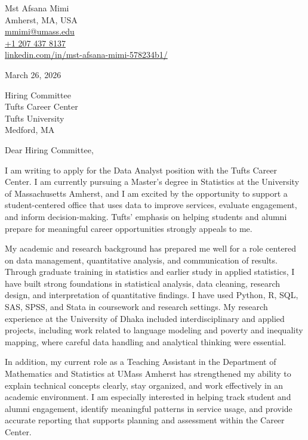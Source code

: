 \documentclass[10pt, letterpaper]{article}
\begin{document}
\begin{flushleft}
Mst Afsana Mimi \\
Amherst, MA, USA \\
\href{mailto:mmimi@umass.edu}{mmimi@umass.edu} \\
\href{tel:+12074378137}{+1 207 437 8137} \\
\href{https://www.linkedin.com/in/mst-afsana-mimi-578234b1/}{linkedin.com/in/mst-afsana-mimi-578234b1/}
\end{flushleft}

\vspace{0.5em}

March 26, 2026

\vspace{1em}

Hiring Committee \\
Tufts Career Center \\
Tufts University \\
Medford, MA

\vspace{1em}

Dear Hiring Committee,

\justifying
I am writing to apply for the Data Analyst position with the Tufts Career Center. I am currently pursuing a Master's degree in Statistics at the University of Massachusetts Amherst, and I am excited by the opportunity to support a student-centered office that uses data to improve services, evaluate engagement, and inform decision-making. Tufts' emphasis on helping students and alumni prepare for meaningful career opportunities strongly appeals to me.

My academic and research background has prepared me well for a role centered on data management, quantitative analysis, and communication of results. Through graduate training in statistics and earlier study in applied statistics, I have built strong foundations in statistical analysis, data cleaning, research design, and interpretation of quantitative findings. I have used Python, R, SQL, SAS, SPSS, and Stata in coursework and research settings. My research experience at the University of Dhaka included interdisciplinary and applied projects, including work related to language modeling and poverty and inequality mapping, where careful data handling and analytical thinking were essential.

In addition, my current role as a Teaching Assistant in the Department of Mathematics and Statistics at UMass Amherst has strengthened my ability to explain technical concepts clearly, stay organized, and work effectively in an academic environment. I am especially interested in helping track student and alumni engagement, identify meaningful patterns in service usage, and provide accurate reporting that supports planning and assessment within the Career Center.
\end{document}
